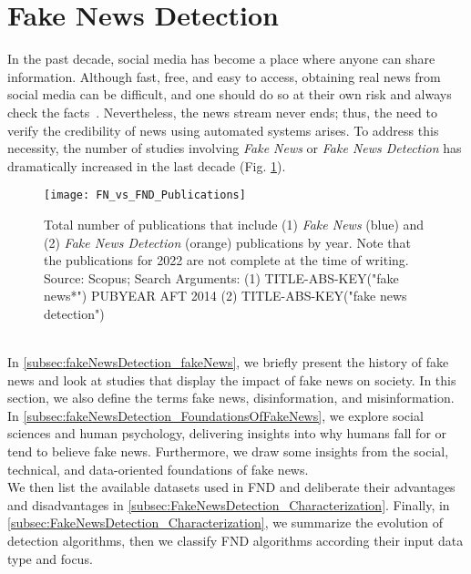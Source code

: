 \section{Fake News Detection}
\label{sec:fakeNewsDetection}
In the past decade, social media has become a place where anyone can share information. Although fast, free, and easy to access, obtaining real news from social media can be difficult, and one should do so at their own risk and always check the facts~\parencite{SocialMediaAndFakeNewsIn2016Election_Allcott,TheScienceOfFakeNews_Lazer}. Nevertheless, the news stream never ends; thus, the need to verify the credibility of news using automated systems arises. To address this necessity, the number of studies involving \emph{Fake News} or \emph{Fake News Detection} has dramatically increased in the last decade (Fig. \ref{fig:FN_vs_FND_Publications}).
\begin{figure}
    \centering
    \texttt{[image: FN\_vs\_FND\_Publications]}
    \caption[Fake News and Fake News Detection Publications by Year]{Total number of publications that include (1) \emph{Fake News} (blue) and (2) \emph{Fake News Detection} (orange) publications by year. Note that the publications for 2022 are not complete at the time of writing. Source: Scopus; Search Arguments: (1) TITLE-ABS-KEY("fake news*") PUBYEAR AFT 2014 (2) TITLE-ABS-KEY("fake news detection")}\label{fig:FN_vs_FND_Publications}
\end{figure}\\
In \ref{subsec:fakeNewsDetection_fakeNews}, we briefly present the history of fake news and look at studies that display the impact of fake news on society. In this section, we also define the terms fake news, disinformation, and misinformation. \\
In \ref{subsec:fakeNewsDetection_FoundationsOfFakeNews}, we explore social sciences and human psychology, delivering insights into why humans fall for or tend to believe fake news. Furthermore, we draw some insights from the social, technical, and data-oriented foundations of fake news.\\
We then list the available datasets used in FND and deliberate their advantages and disadvantages in \ref{subsec:FakeNewsDetection_Characterization}. Finally, in \ref{subsec:FakeNewsDetection_Characterization}, we summarize the evolution of detection algorithms, then we classify FND algorithms according their input data type and focus.

